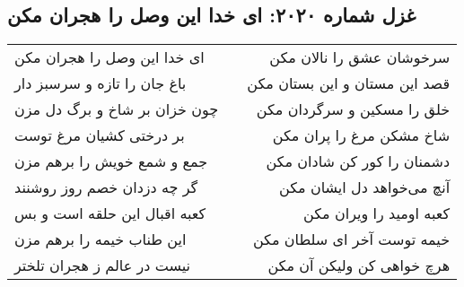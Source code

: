 \begin{center}
\section*{غزل شماره ۲۰۲۰: ای خدا این وصل را هجران مکن}
\label{sec:2020}
\begin{longtable}{l p{0.5cm} r}
ای خدا این وصل را هجران مکن
&&
سرخوشان عشق را نالان مکن
\\
باغ جان را تازه و سرسبز دار
&&
قصد این مستان و این بستان مکن
\\
چون خزان بر شاخ و برگ دل مزن
&&
خلق را مسکین و سرگردان مکن
\\
بر درختی کشیان مرغ توست
&&
شاخ مشکن مرغ را پران مکن
\\
جمع و شمع خویش را برهم مزن
&&
دشمنان را کور کن شادان مکن
\\
گر چه دزدان خصم روز روشنند
&&
آنچ می‌خواهد دل ایشان مکن
\\
کعبه اقبال این حلقه است و بس
&&
کعبه اومید را ویران مکن
\\
این طناب خیمه را برهم مزن
&&
خیمه توست آخر ای سلطان مکن
\\
نیست در عالم ز هجران تلختر
&&
هرچ خواهی کن ولیکن آن مکن
\\
\end{longtable}
\end{center}
